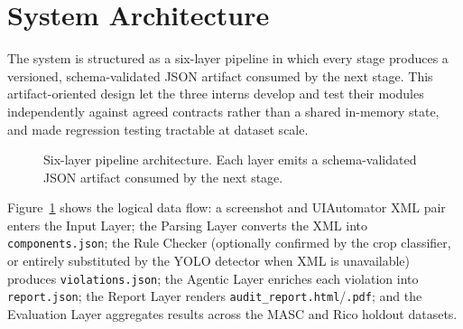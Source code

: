 \documentclass[10pt,conference]{IEEEtran}
\begin{document}
\section{System Architecture}

The system is structured as a six-layer pipeline in which every stage produces a versioned, schema-validated JSON artifact consumed by the next stage. This artifact-oriented design let the three interns develop and test their modules independently against agreed contracts rather than a shared in-memory state, and made regression testing tractable at dataset scale.

\begin{figure}[!t]
\centering
{}
\caption{Six-layer pipeline architecture. Each layer emits a schema-validated JSON artifact consumed by the next stage.}
\label{fig:pipeline}
\end{figure}

Figure~\ref{fig:pipeline} shows the logical data flow: a screenshot and UIAutomator XML pair enters the Input Layer; the Parsing Layer converts the XML into \texttt{components.json}; the Rule Checker (optionally confirmed by the crop classifier, or entirely substituted by the YOLO detector when XML is unavailable) produces \texttt{violations.json}; the Agentic Layer enriches each violation into \texttt{report.json}; the Report Layer renders \texttt{audit\_report.html}/\texttt{.pdf}; and the Evaluation Layer aggregates results across the MASC and Rico holdout datasets.
\end{document}
